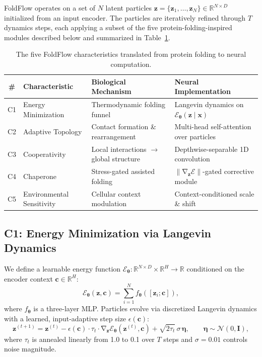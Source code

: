 \documentclass[10pt]{article}
\newcommand{\R}{\mathbb{R}}
\newcommand{\E}{\mathcal{E}}
\newcommand{\bz}{\mathbf{z}}
\newcommand{\bx}{\mathbf{x}}
\newcommand{\bc}{\mathbf{c}}
\newcommand{\btheta}{\boldsymbol{\theta}}
\DeclareMathOperator{\grad}{\nabla}
\begin{document}
FoldFlow operates on a set of $N$ latent particles
$\bz = \{\bz_1, \ldots, \bz_N\} \in \R^{N \times D}$ initialized
from an input encoder.  The particles are iteratively refined through
$T$ dynamics steps, each applying a subset of the five
protein-folding-inspired modules described below and summarized in
Table~\ref{tab:characteristics}.

\begin{table}[t]
\centering
\caption{The five FoldFlow characteristics translated from protein folding
  to neural computation.}
\label{tab:characteristics}
\small
\begin{tabular}{@{}clll@{}}
\toprule
\# & Characteristic & Biological Mechanism & Neural Implementation \\
\midrule
C1 & Energy Minimization & Thermodynamic folding funnel
    & Langevin dynamics on $\E_\btheta(\bz \mid \bx)$ \\
C2 & Adaptive Topology & Contact formation \& rearrangement
    & Multi-head self-attention over particles \\
C3 & Cooperativity & Local interactions $\to$ global structure
    & Depthwise-separable 1D convolution \\
C4 & Chaperone & Stress-gated assisted folding
    & $\|\grad_\bz \E\|$-gated corrective module \\
C5 & Environmental Sensitivity & Cellular context modulation
    & Context-conditioned scale \& shift \\
\bottomrule
\end{tabular}
\end{table}

\subsection{C1: Energy Minimization via Langevin Dynamics}
\label{sec:c1}

We define a learnable energy function
$\E_\btheta : \R^{N \times D} \times \R^{H} \to \R$ conditioned on
the encoder context $\bc \in \R^H$:
\begin{equation}
  \E_\btheta(\bz, \bc) = \sum_{i=1}^{N}
    f_\btheta([\bz_i; \bc]),
\label{eq:energy}
\end{equation}
where $f_\btheta$ is a three-layer MLP.  Particles evolve via
discretized Langevin dynamics with a learned, input-adaptive step size
$\epsilon(\bc)$:
\begin{equation}
  \bz^{(t+1)} = \bz^{(t)}
    - \epsilon(\bc) \cdot \tau_t \cdot \grad_\bz \E_\btheta(\bz^{(t)}, \bc)
    + \sqrt{2\tau_t}\,\sigma\,\boldsymbol{\eta},
  \qquad \boldsymbol{\eta} \sim \mathcal{N}(0, \mathbf{I}),
\label{eq:langevin}
\end{equation}
where $\tau_t$ is annealed linearly from 1.0 to 0.1 over $T$ steps
and $\sigma = 0.01$ controls noise magnitude.
\end{document}
